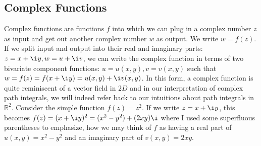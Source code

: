 \subsection{Complex Functions}
Complex functions are functions $f$ into which we can plug in a complex number $z$ as input and get out another complex number $w$ as output. We write $w = f(z)$. If we split input and output into their real and imaginary parts: $z = x + \i y, w = u  + \i v$, we can write the complex function in terms of two bivariate component functions: $u = u(x,y), v = v(x,y)$ such that $w = f(z) = f(x + \i y) = u(x,y) + \i v(x,y)$. In this form, a complex function is quite reminiscent of a vector field in $2D$ and in our interpretation of complex path integrals, we will indeed refer back to our intuitions about path integrals in $\mathbb{R}^2$. Consider the simple function $f(z) = z^2$. If we write $z = x + \i y$, this becomes $f(z) = (x + \i y)^2 = (x^2 - y^2) + (2 x y ) \i$ where I used some superfluous parentheses to emphasize, how we may think of $f$ as having a real part of $u(x,y) = x^2 - y^2$ and an imaginary part of $v(x,y) = 2 x y$.






